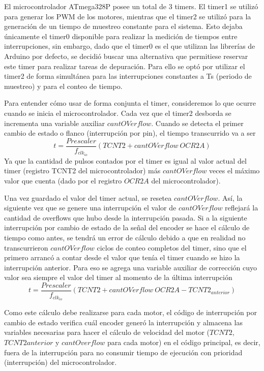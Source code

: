 \documentclass[10pt,conference,a4paper,onecolumn]{article}%
\begin{document}
El microcontrolador ATmega328P posee un total de 3 timers. El timer1 se utilizó para generar los PWM de los motores, mientras que el timer2 se utilizó para la generación de un tiempo de muestreo constante para el sistema. Esto dejaba únicamente el timer0 disponible para realizar la medición de tiempos entre interrupciones,
sin embargo, dado que el timer0 es el que utilizan las librerías de Arduino por defecto, se decidió buscar una alternativa que permitiese reservar este timer para realizar tareas de depuración. Para ello se optó por utilizar el timer2 de forma simultánea para las interrupciones constantes a Ts (periodo de muestreo) y para el conteo de tiempo.

Para entender cómo usar de forma conjunta el timer, consideremos lo que ocurre cuando se inicia el microcontrolador. Cada vez que el timer2 desborda se incrementa una variable auxiliar $cantOVerflow$. Cuando se detecta el primer cambio de estado o flanco (interrupción por pin), el tiempo transcurrido va a ser
 \begin{equation*}
 t=\frac{Prescaler}{f_{clk_{io}}} (TCNT2+cantOVerflow\ OCR2A)
 \end{equation*}
Ya que la cantidad de pulsos contados por el timer es igual al valor actual del timer (registro TCNT2 del microcontrolador) más $cantOVerflow$ veces el máximo valor que cuenta (dado por el registro $OCR2A$ del microcontrolador).

Una vez guardado el valor del timer actual, se resetea $cantOVerflow$. Así, la siguiente vez que se genere una interrupción el valor de $cantOVerflow$ reflejará la cantidad de overflows que hubo desde la interrupción pasada. Si a la siguiente interrupción por cambio de estado de la señal del encoder se hace el cálculo de tiempo como
antes, se tendrá  un error de cálculo debido a que en realidad no transcurrieron $cantOVerflow$ ciclos de conteo completos del timer, sino que el primero arrancó a contar desde el valor que tenía el timer cuando se hizo la interrupción anterior. Para eso se agrega una variable auxiliar de corrección cuyo valor sea siempre el valor del
timer al momento de la última interrupción
 \begin{equation}
 t=\frac{Prescaler}{f_{clk_{io}}} (TCNT2+cantOVerflow\ OCR2A-TCNT2_{anterior})
 \end{equation}

Como este cálculo debe realizarse para cada motor, el código de interrupción por cambio de estado verifica cuál encoder generó la interrupción y almacena las variables necesarias para hacer el cálculo de velocidad del motor ($TCNT2$, $TCNT2anterior$ y $cantOverflow$ para cada motor) en el código principal, es decir, fuera de la interrupción para no consumir tiempo de ejecución con prioridad (interrupción) del microcontrolador.
\end{document}
